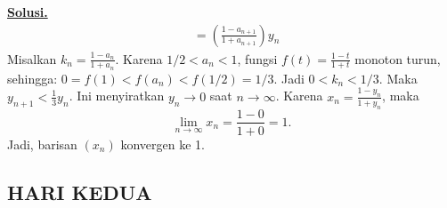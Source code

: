 \documentclass[12pt,twoside]{article}
\newenvironment{solution}
{
	\par\noindent\textbf{\underline{Solusi.}}\\
}
{
	\par
}
\begin{document}
\begin{enumerate}
\begin{solution}
\begin{align*}
                    & = \left( \frac{1-a_{n+1}}{1+a_{n+1}} \right) y_n
          \end{align*}
          Misalkan $k_n = \frac{1-a_n}{1+a_n}$. Karena $1/2 < a_n < 1$, fungsi $f(t)=\frac{1-t}{1+t}$ monoton turun, sehingga:
          $0 = f(1) < f(a_n) < f(1/2) = 1/3$.
          Jadi $0 < k_n < 1/3$.
          Maka $y_{n+1} < \frac{1}{3} y_n$.
          Ini menyiratkan $y_n \to 0$ saat $n \to \infty$.
          Karena $x_n = \frac{1-y_n}{1+y_n}$, maka
          \[ \lim_{n \to \infty} x_n = \frac{1-0}{1+0} = 1. \]
          Jadi, barisan $(x_n)$ konvergen ke 1.
        \end{solution}
\end{enumerate}
\pagebreak
\subsection{HARI KEDUA}
\end{document}
